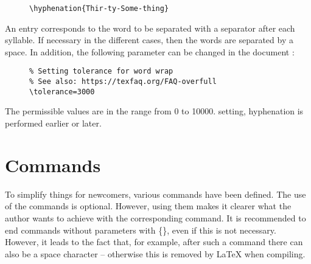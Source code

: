 \begin{figure}[H]
    \small
    \centering
    \begin{BVerbatim}
\hyphenation{Thir-ty-Some-thing}
    \end{BVerbatim}
\end{figure}

An entry corresponds to the word to be separated with a separator after each
syllable. If necessary in the different cases, then the words are separated
by a space. In addition, the following parameter can be changed in the document
:

\begin{figure}[H]
    \small
    \centering
    \begin{BVerbatim}
\tolerance=3000
    \end{BVerbatim}
\end{figure}

The permissible values are in the range from 0 to 10000. setting, hyphenation
is performed earlier or later.

\section{Commands}
\label{sec:Commands}

To simplify things for newcomers, various commands have been defined. The use
of the commands is optional. However, using them makes it clearer what the
author wants to achieve with the corresponding command. It is recommended to
end commands without parameters with \{\}, even if this is not necessary.
However, it leads to the fact that, for example, after such a command there
can also be a space character -- otherwise this is removed by \LaTeX{} when
compiling.

